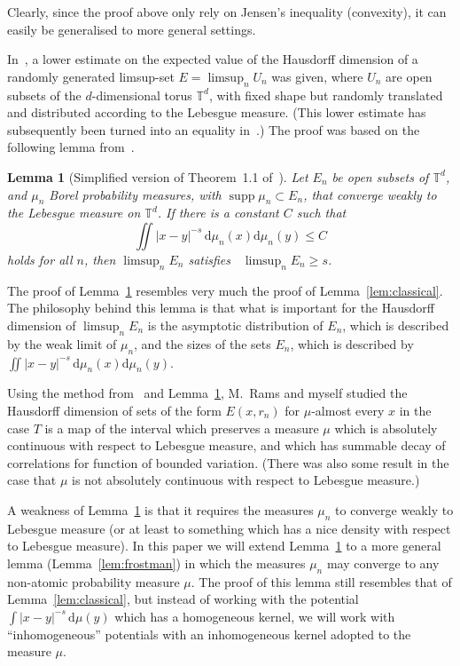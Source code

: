 \documentclass[11pt]{article}
\newtheorem{lemm}[theo]{Lemma}
\theoremstyle{definition}
\numberwithin{equation}{section}
\numberwithin{figure}{section}
\numberwithin{table}{section}
\DeclareMathOperator{\dimh}{dim_H}
\DeclareMathOperator{\supp}{supp}
\newcommand*{\dd}{\mathrm{d}}
\begin{document}
Clearly, since the proof above only rely on Jensen's inequality (convexity), it can easily be generalised to more general settings.

In~\cite{persson}, a lower estimate on the expected value of the Hausdorff dimension of a randomly generated limsup-set $E = \limsup_n U_n$ was given, where $U_n$ are open subsets of the $d$-dimensional torus $\mathbb{T}^d$, with fixed shape but randomly translated and distributed according to the Lebesgue measure. (This lower estimate has subsequently been turned into an equality in~\cite{fengetal}.) The proof was based on the following lemma from~\cite{perssonreeve}.

\begin{lemm}[Simplified version of Theorem~1.1 of~\cite{perssonreeve}] \label{lem:perssonreeve}
Let $E_n$ be open subsets of\/ $\mathbb{T}^d$, and $\mu_n$ Borel probability measures, with $\supp \mu_n \subset E_n$, that converge weakly to the Lebesgue measure on $\mathbb{T}^d$. If there is a constant $C$ such that
\begin{equation}\label{eq:bounded_energy}
\iint |x - y|^{-s} \, \dd \mu_n (x) \dd \mu_n (y)
\leq C
\end{equation}
holds for all $n$, then $\limsup_n E_n$ satisfies $\dimh \limsup_n E_n \geq s$.
\end{lemm}

The proof of Lemma~\ref{lem:perssonreeve} resembles very much the proof of Lemma~\ref{lem:classical}. The philosophy behind this lemma is that what is important for the Hausdorff dimension of $\limsup_n E_n$ is the asymptotic distribution of $E_n$, which is described by the weak limit of $\mu_n$, and the sizes of the sets $E_n$, which is described by $\iint |x-y|^{-s} \, \dd\mu_n (x) \dd\mu_n (y)$.

Using the method from~\cite{persson} and Lemma~\ref{lem:perssonreeve}, M.~Rams and myself studied the Hausdorff dimension of sets of the form $E(x,r_n)$ for $\mu$-almost every $x$ in the case $T$ is a map of the interval which preserves a measure $\mu$ which is absolutely continuous with respect to Lebesgue measure, and which has summable decay of correlations for function of bounded variation. (There was also some result in the case that $\mu$ is not absolutely continuous with respect to Lebesgue measure.)

A weakness of Lemma~\ref{lem:perssonreeve} is that it requires the measures $\mu_n$ to converge weakly to Lebesgue measure (or at least to something which has a nice density with respect to Lebesgue measure). In this paper we will extend Lemma~\ref{lem:perssonreeve} to a more general lemma (Lemma~\ref{lem:frostman}) in which the measures $\mu_n$ may converge to any non-atomic probability measure $\mu$. The proof of this lemma still resembles that of Lemma~\ref{lem:classical}, but instead of working with the potential $\int |x-y|^{-s} \,
\dd\mu (y)$ which has a homogeneous kernel, we will work with ``inhomogeneous'' potentials with an inhomogeneous kernel adopted to the measure $\mu$.
\end{document}
